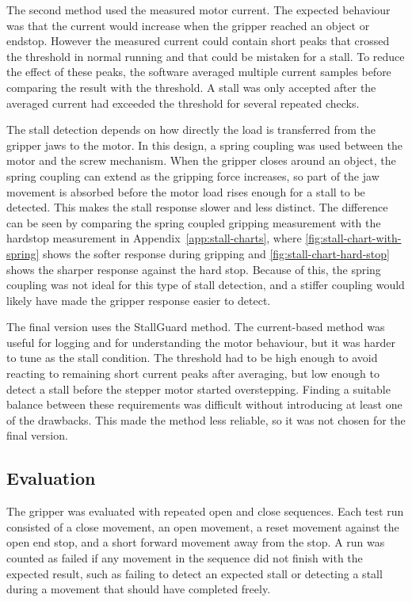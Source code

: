 The second method used the measured motor current. The expected behaviour was that the current would increase when the gripper reached an object or endstop. However the measured current could contain short peaks that crossed the threshold in normal running and that could be mistaken for a stall. To reduce the effect of these peaks, the software averaged multiple current samples before comparing the result with the threshold. A stall was only accepted after the averaged current had exceeded the threshold for several repeated checks.

The stall detection depends on how directly the load is transferred from the gripper jaws to the motor. In this design, a spring coupling was used between the motor and the screw mechanism. When the gripper closes around an object, the spring coupling can extend as the gripping force increases, so part of the jaw movement is absorbed before the motor load rises enough for a stall to be detected. This makes the stall response slower and less distinct. The difference can be seen by comparing the spring coupled gripping measurement with the hardstop measurement in Appendix~\ref{app:stall-charts}, where \cref{fig:stall-chart-with-spring} shows the softer response during gripping and \cref{fig:stall-chart-hard-stop} shows the sharper response against the hard stop. Because of this, the spring coupling was not ideal for this type of stall detection, and a stiffer coupling would likely have made the gripper response easier to detect.

The final version uses the StallGuard method. The current-based method was useful for logging and for understanding the motor behaviour, but it was harder to tune as the stall condition. The threshold had to be high enough to avoid reacting to remaining short current peaks after averaging, but low enough to detect a stall before the stepper motor started overstepping. Finding a suitable balance between these requirements was difficult without introducing at least one of the drawbacks. This made the method less reliable, so it was not chosen for the final version.

\subsection{Evaluation}

The gripper was evaluated with repeated open and close sequences. Each test run consisted of a close movement, an open movement, a reset movement against the open end stop, and a short forward movement away from the stop. A run was counted as failed if any movement in the sequence did not finish with the expected result, such as failing to detect an expected stall or detecting a stall during a movement that should have completed freely.

